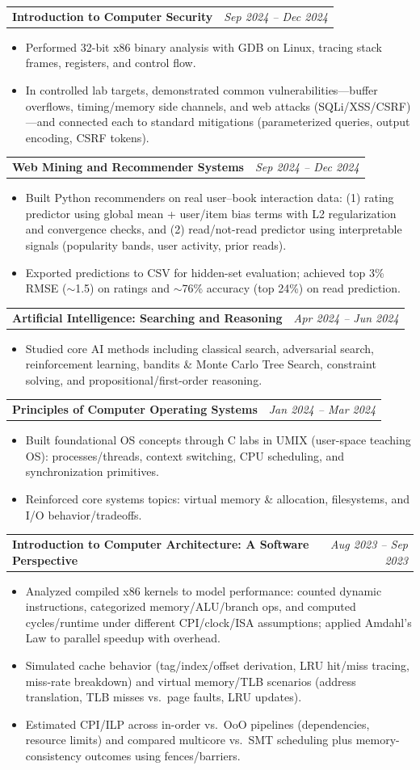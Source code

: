 \documentclass[letterpaper,11pt]{article}
\makeatletter
\newcommand{\resumeItem}[1]{
  \item\small{
    {#1 \vspace{-2pt}}
  }
}
\newcommand{\resumeCourseheading}[2]{
  \vspace{-1pt}\item
    \begin{tabular*}{0.97\textwidth}[t]{l@{\extracolsep{\fill}}r}
      \textbf{#1} & \textit{\small #2} \\
    \end{tabular*}\vspace{-5pt}
}
\newcommand{\resumeItemListStart}{\begin{itemize}}
\newcommand{\resumeItemListEnd}{\end{itemize}\vspace{-5pt}}
\makeatother
\begin{document}
    \resumeCourseheading
      {Introduction to Computer Security}{Sep 2024 -- Dec 2024}
      \resumeItemListStart
        \resumeItem{Performed 32-bit x86 binary analysis with GDB on Linux, tracing stack frames, registers, and control flow.}
        \resumeItem{In controlled lab targets, demonstrated common vulnerabilities---buffer overflows, timing/memory side channels, and web attacks (SQLi/XSS/CSRF)---and connected each to standard mitigations (parameterized queries, output encoding, CSRF tokens).}
      \resumeItemListEnd

    \resumeCourseheading
      {Web Mining and Recommender Systems}{Sep 2024 -- Dec 2024}
      \resumeItemListStart
        \resumeItem{Built Python recommenders on real user--book interaction data: (1) rating predictor using global mean + user/item bias terms with L2 regularization and convergence checks, and (2) read/not-read predictor using interpretable signals (popularity bands, user activity, prior reads).}
        \resumeItem{Exported predictions to CSV for hidden-set evaluation; achieved top 3\% RMSE ($\sim$1.5) on ratings and $\sim$76\% accuracy (top 24\%) on read prediction.}
      \resumeItemListEnd

    \resumeCourseheading
      {Artificial Intelligence: Searching and Reasoning}{Apr 2024 -- Jun 2024}
      \resumeItemListStart
        \resumeItem{Studied core AI methods including classical search, adversarial search, reinforcement learning, bandits \& Monte Carlo Tree Search, constraint solving, and propositional/first-order reasoning.}
      \resumeItemListEnd

    \resumeCourseheading
      {Principles of Computer Operating Systems}{Jan 2024 -- Mar 2024}
      \resumeItemListStart
        \resumeItem{Built foundational OS concepts through C labs in UMIX (user-space teaching OS): processes/threads, context switching, CPU scheduling, and synchronization primitives.}
        \resumeItem{Reinforced core systems topics: virtual memory \& allocation, filesystems, and I/O behavior/tradeoffs.}
      \resumeItemListEnd

    \resumeCourseheading
      {Introduction to Computer Architecture: A Software Perspective}{Aug 2023 -- Sep 2023}
      \resumeItemListStart
        \resumeItem{Analyzed compiled x86 kernels to model performance: counted dynamic instructions, categorized memory/ALU/branch ops, and computed cycles/runtime under different CPI/clock/ISA assumptions; applied Amdahl's Law to parallel speedup with overhead.}
        \resumeItem{Simulated cache behavior (tag/index/offset derivation, LRU hit/miss tracing, miss-rate breakdown) and virtual memory/TLB scenarios (address translation, TLB misses vs.\ page faults, LRU updates).}
        \resumeItem{Estimated CPI/ILP across in-order vs.\ OoO pipelines (dependencies, resource limits) and compared multicore vs.\ SMT scheduling plus memory-consistency outcomes using fences/barriers.}
      \resumeItemListEnd
\end{document}
